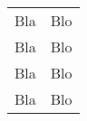 \begin{tabular}{>{\small}L{.3\textwidth}>{\small}p{.4\textwidth}}
  \toprule {} &
   \\ \midrule
  \addlinespace
  Bla & Blo \\
  Bla & Blo \\
  Bla & Blo \\
  Bla & Blo \\
  \bottomrule
\end{tabular}
